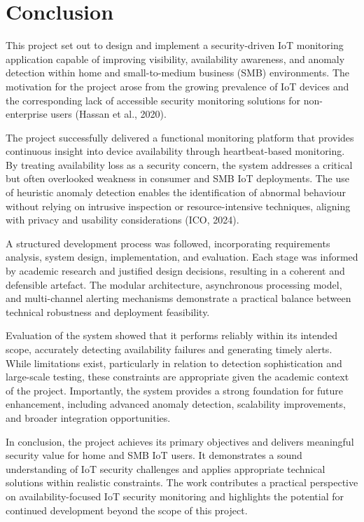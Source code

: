 \chapter{Conclusion}
\label{ch:conc}

This project set out to design and implement a security-driven IoT monitoring application capable of improving visibility, availability awareness, and anomaly detection within home and small-to-medium business (SMB) environments. The motivation for the project arose from the growing prevalence of IoT devices and the corresponding lack of accessible security monitoring solutions for non-enterprise users (Hassan et al., 2020).

The project successfully delivered a functional monitoring platform that provides continuous insight into device availability through heartbeat-based monitoring. By treating availability loss as a security concern, the system addresses a critical but often overlooked weakness in consumer and SMB IoT deployments. The use of heuristic anomaly detection enables the identification of abnormal behaviour without relying on intrusive inspection or resource-intensive techniques, aligning with privacy and usability considerations (ICO, 2024).

A structured development process was followed, incorporating requirements analysis, system design, implementation, and evaluation. Each stage was informed by academic research and justified design decisions, resulting in a coherent and defensible artefact. The modular architecture, asynchronous processing model, and multi-channel alerting mechanisms demonstrate a practical balance between technical robustness and deployment feasibility.

Evaluation of the system showed that it performs reliably within its intended scope, accurately detecting availability failures and generating timely alerts. While limitations exist, particularly in relation to detection sophistication and large-scale testing, these constraints are appropriate given the academic context of the project. Importantly, the system provides a strong foundation for future enhancement, including advanced anomaly detection, scalability improvements, and broader integration opportunities.

In conclusion, the project achieves its primary objectives and delivers meaningful security value for home and SMB IoT users. It demonstrates a sound understanding of IoT security challenges and applies appropriate technical solutions within realistic constraints. The work contributes a practical perspective on availability-focused IoT security monitoring and highlights the potential for continued development beyond the scope of this project.
